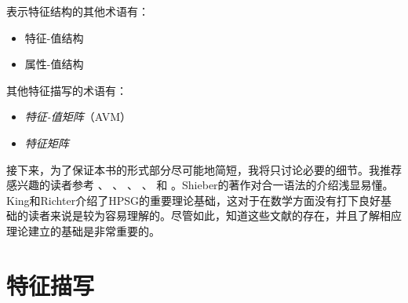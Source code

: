 表示特征结构的其他术语有：
\begin{itemize}
\item 特征-值结构
\item 属性-值结构
\end{itemize}
其他特征描写的术语有：
\begin{itemize}
\item \emph{特征-值矩阵}（AVM）
\item \emph{特征矩阵}
\end{itemize}
接下来，为了保证本书的形式部分尽可能地简短，我将只讨论必要的细节。我推荐感兴趣的读者参考 \citet{Shieber86a}、 \citet[第2章]{ps}、 \citet{Johnson88}、 \citet{Carpenter92a}、 \citet{King94a}和 \citet{Richter2004a-u}。Shieber的著作对合一语法的介绍浅显易懂。King和Richter介绍了HPSG的重要理论基础，这对于在数学方面没有打下良好基础的读者来说是较为容易理解的。尽管如此，知道这些文献的存在，并且了解相应理论建立的基础是非常重要的。

\section{特征描写}

